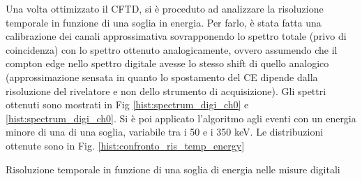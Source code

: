 Una volta ottimizzato il CFTD, si è proceduto ad analizzare la risoluzione temporale in funzione di una soglia in energia. Per farlo, è stata fatta una calibrazione dei canali approssimativa sovrapponendo lo spettro totale (privo di coincidenza) con lo spettro ottenuto analogicamente, ovvero assumendo che il compton edge nello spettro digitale avesse lo stesso shift di quello analogico (approssimazione sensata in quanto lo spostamento del CE dipende dalla risoluzione del rivelatore e non dello strumento di acquisizione). Gli spettri ottenuti sono mostrati in Fig \ref{hist:spectrum_digi_ch0} e \ref{hist:spectrum_digi_ch0}. Si è poi applicato l'algoritmo agli eventi con un energia minore di una di una soglia, variabile tra i 50 e i 350 keV. Le distribuzioni ottenute sono in Fig. \ref{hist:confronto_ris_temp_energy}








\begin{table}[h]
	\centering
	
	\caption{Risoluzione temporale in funzione di una soglia di energia nelle misure digitali}
	\label{tab:threshold_fwhm_digi}
\end{table}
